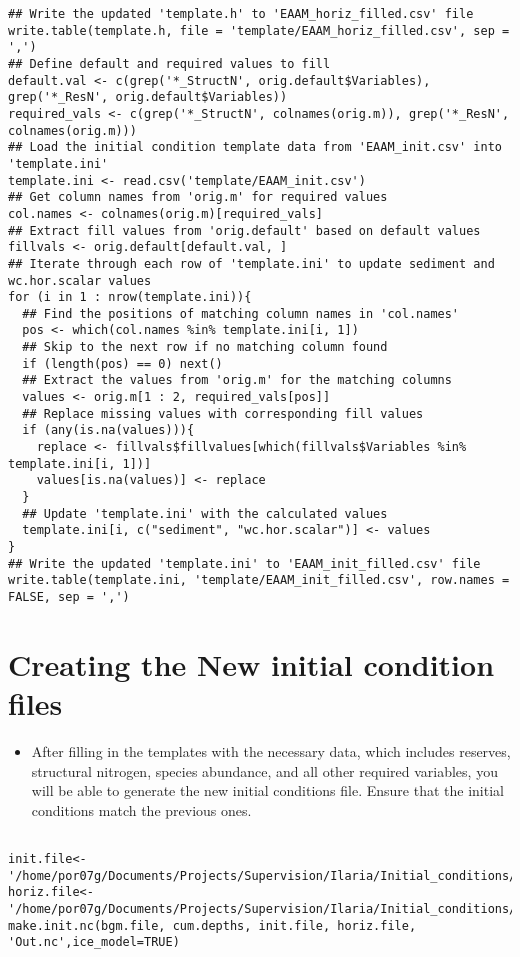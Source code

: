 \documentclass[a4paper]{article}
\begin{document}
\begin{verbatim}
## Write the updated 'template.h' to 'EAAM_horiz_filled.csv' file
write.table(template.h, file = 'template/EAAM_horiz_filled.csv', sep = ',')
## Define default and required values to fill
default.val <- c(grep('*_StructN', orig.default$Variables), grep('*_ResN', orig.default$Variables))
required_vals <- c(grep('*_StructN', colnames(orig.m)), grep('*_ResN', colnames(orig.m)))
## Load the initial condition template data from 'EAAM_init.csv' into 'template.ini'
template.ini <- read.csv('template/EAAM_init.csv')
## Get column names from 'orig.m' for required values
col.names <- colnames(orig.m)[required_vals]
## Extract fill values from 'orig.default' based on default values
fillvals <- orig.default[default.val, ]
## Iterate through each row of 'template.ini' to update sediment and wc.hor.scalar values
for (i in 1 : nrow(template.ini)){
  ## Find the positions of matching column names in 'col.names'
  pos <- which(col.names %in% template.ini[i, 1])
  ## Skip to the next row if no matching column found
  if (length(pos) == 0) next()
  ## Extract the values from 'orig.m' for the matching columns
  values <- orig.m[1 : 2, required_vals[pos]]
  ## Replace missing values with corresponding fill values
  if (any(is.na(values))){
    replace <- fillvals$fillvalues[which(fillvals$Variables %in% template.ini[i, 1])]
    values[is.na(values)] <- replace
  }
  ## Update 'template.ini' with the calculated values
  template.ini[i, c("sediment", "wc.hor.scalar")] <- values
}
## Write the updated 'template.ini' to 'EAAM_init_filled.csv' file
write.table(template.ini, 'template/EAAM_init_filled.csv', row.names = FALSE, sep = ',')
\end{verbatim}

\section{Creating the New initial condition files}
\label{sec:org8155e31}
\begin{itemize}
\item After filling in the templates with the necessary data, which includes reserves,
structural nitrogen, species abundance, and all other required variables, you will
be able to generate the new initial conditions file. Ensure that the initial
conditions match the previous ones.
\end{itemize}
\begin{verbatim}

init.file<- '/home/por07g/Documents/Projects/Supervision/Ilaria/Initial_conditions/template/EAAM_init_filled.csv'
horiz.file<-'/home/por07g/Documents/Projects/Supervision/Ilaria/Initial_conditions/template/EAAM_horiz_filled.csv'
make.init.nc(bgm.file, cum.depths, init.file, horiz.file, 'Out.nc',ice_model=TRUE)
\end{verbatim}
\end{document}
